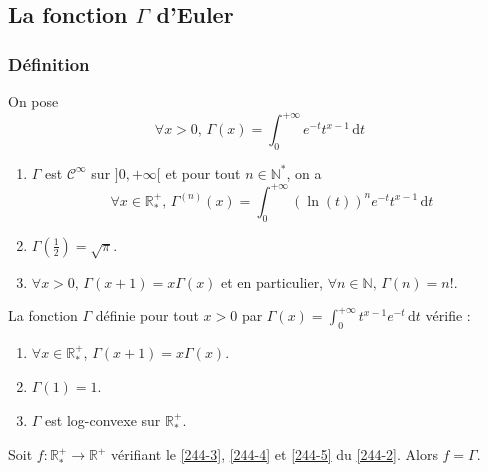	\subsection{La fonction \texorpdfstring{$\Gamma$}{Gamma} d'Euler}

	\subsubsection{Définition}


	\begin{definition}
		On pose
		\[ \forall x > 0, \, \Gamma(x) = \int_0^{+\infty} e^{-t} t^{x-1} \, \mathrm{d}t \]
	\end{definition}

	\begin{proposition}
		\begin{enumerate}[label=(\roman*)]
			\item $\Gamma$ est $\mathcal{C}^\infty$ sur $]0, +\infty[$ et pour tout $n \in \mathbb{N}^*$, on a
			\[ \forall x \in \mathbb{R}_*^+, \, \Gamma^{(n)}(x) = \int_{0}^{+\infty} (\ln(t))^n e^{-t} t^{x-1} \, \mathrm{d}t \]
			\item $\Gamma \left( \frac{1}{2} \right) = \sqrt{\pi}$.
			\item $\forall x > 0, \, \Gamma(x+1) = x \Gamma(x)$ et en particulier, $\forall n \in \mathbb{N}, \, \Gamma(n) = n!$.
		\end{enumerate}
	\end{proposition}


	\begin{lemma}
		\label{244-2}
		La fonction $\Gamma$ définie pour tout $x > 0$ par $\Gamma(x) = \int_0^{+\infty} t^{x-1} e^{-t} \, \mathrm{d}t$ vérifie :
		\begin{enumerate}[label=(\roman*)]
			\item \label{244-3} $\forall x \in \mathbb{R}^+_*$, $\Gamma(x+1) = x\Gamma(x)$.
			\item \label{244-4} $\Gamma(1) = 1$.
			\item \label{244-5} $\Gamma$ est log-convexe sur $\mathbb{R}^+_*$.
		\end{enumerate}
	\end{lemma}


	\begin{theorem}
		Soit $f : \mathbb{R}^+_* \rightarrow \mathbb{R}^+$ vérifiant le \cref{244-3}, \cref{244-4} et \cref{244-5} du \cref{244-2}. Alors $f = \Gamma$.
	\end{theorem}

